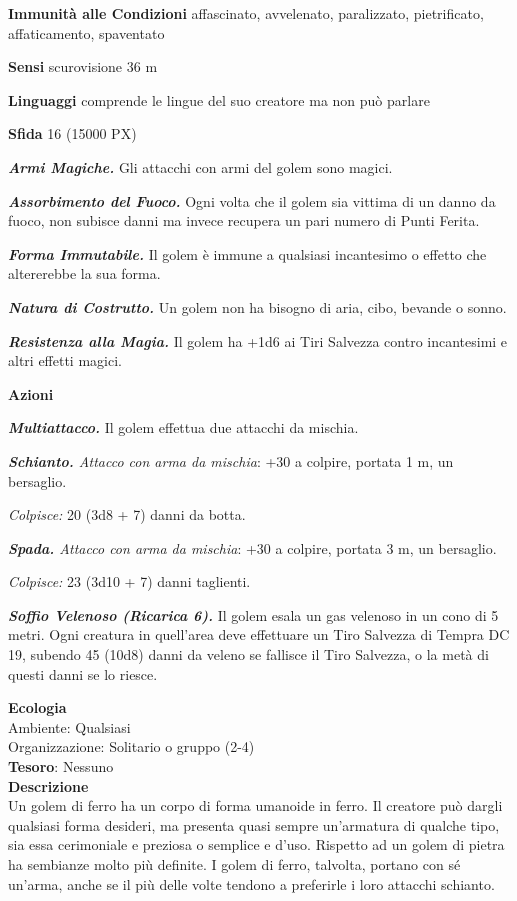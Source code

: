 \begin{multicols}{2}
\textbf{Immunità alle Condizioni} affascinato, avvelenato, paralizzato, pietrificato, affaticamento, spaventato

\textbf{Sensi} scurovisione 36 m

\textbf{Linguaggi} comprende le lingue del suo creatore ma non può parlare

\textbf{Sfida} 16 (15000 PX)

\textit{\textbf{Armi Magiche.}} Gli attacchi con armi del golem sono magici.

\textit{\textbf{Assorbimento del Fuoco.}} Ogni volta che il golem sia vittima di un danno da fuoco, non subisce danni ma invece recupera un pari numero di Punti Ferita.

\textit{\textbf{Forma Immutabile.}} Il golem è immune a qualsiasi incantesimo o effetto che altererebbe la sua forma.

\textit{\textbf{Natura di Costrutto.}} Un golem non ha bisogno di aria, cibo, bevande o sonno.

\textit{\textbf{Resistenza alla Magia.}} Il golem ha +1d6 ai Tiri Salvezza contro incantesimi e altri effetti magici.

\textbf{Azioni}

\textit{\textbf{Multiattacco.}} Il golem effettua due attacchi da mischia.

\textit{\textbf{Schianto.} Attacco con arma da mischia}: +30 a colpire, portata 1 m, un bersaglio.

\textit{Colpisce:} 20 (3d8 + 7) danni da botta.

\textit{\textbf{Spada.} Attacco con arma da mischia}: +30 a colpire, portata 3 m, un bersaglio.

\textit{Colpisce:} 23 (3d10 + 7) danni taglienti.

\textit{\textbf{Soffio Velenoso (Ricarica 6).}} Il golem esala un gas velenoso in un cono di 5 metri. Ogni creatura in quell'area deve effettuare un Tiro Salvezza di Tempra DC 19, subendo 45 (10d8) danni da veleno se fallisce il Tiro Salvezza, o la metà di questi danni se lo riesce.

\textbf{Ecologia}\\
Ambiente: Qualsiasi\\
Organizzazione: Solitario o gruppo (2-4)\\
\textbf{Tesoro}: Nessuno\\
\textbf{Descrizione}\\
Un golem di ferro ha un corpo di forma umanoide in ferro. Il creatore può dargli qualsiasi forma desideri, ma presenta quasi sempre un'armatura di qualche tipo, sia essa cerimoniale e preziosa o semplice e d'uso. Rispetto ad un golem di pietra ha sembianze molto più definite. I golem di ferro, talvolta, portano con sé un'arma, anche se il più delle volte tendono a preferirle i loro attacchi schianto.


\end{multicols}
